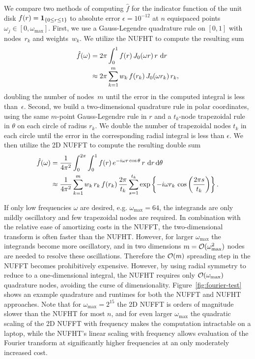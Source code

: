 We compare two methods of computing $\hat{f}$ for the indicator function of the
unit disk $f(r) = \bm{1}_{\left\{ 0 \leq r \leq 1\right\}}$ to absolute error $\epsilon = 10^{-12}$
at $n$ equispaced points $\omega_j \in [0, \omega_{\text{max}}]$. First, we use
a Gauss-Legendre quadrature rule on $[0,1]$ with nodes~$r_k$ and weights~$w_k$.
We utilize the NUFHT to compute the resulting sum
\begin{equation}
  \begin{aligned}
  \hat{f}(\omega) 
  &= 2\pi\int_0^1 f(r) \, J_0(\omega r) \, r \, \mathop{}\!\mathrm{d}{r} \\
  &\approx 2\pi \sum_{k=1}^m w_k \, f(r_k) \, J_0(\omega r_k) \, r_k,
  \end{aligned}
\end{equation}
doubling the number of nodes~$m$ until the error in the computed integral is
less than~$\epsilon$. Second, we build a two-dimensional quadrature rule in
polar coordinates, using the same $m$-point Gauss-Legendre rule in $r$ and a
$t_k$-node trapezoidal rule in $\theta$ on each circle of radius $r_k$. We
double the number of trapezoidal nodes $t_k$ in each circle until the error in
the corresponding radial integral is less than $\epsilon$. We then utilize the
2D NUFFT to compute the resulting double sum
\begin{align}
  \hat{f}(\omega) 
  &= \frac{1}{4\pi^2} \int_0^{2\pi} \int_0^1 f(r) \, e^{-i\omega r\cos\theta} \,
    r \, \mathop{}\!\mathrm{d}{r} \mathop{}\!\mathrm{d}{\theta} \\
  &\approx \frac{1}{4\pi^2} \sum_{k=1}^{m} w_k \, r_k \, f(r_k) \,
    \frac{2\pi}{t_k}
    \sum_{s=1}^{t_k} \exp\left\{-i\omega r_k \, \cos\left(\frac{2\pi s}{t_k}\right)\right\}.
\end{align}

If only low frequencies $\omega$ are desired, e.g. $\omega_{\text{max}} = 64$,
the integrands are only mildly oscillatory and few trapezoidal nodes are
required. In combination with the relative ease of amortizing costs in the
NUFFT, the two-dimensional transform is often faster than the NUFHT. However,
for larger $\omega_{\text{max}}$ the integrands become more oscillatory, and in
two dimensions $m = \mathcal{O}(\omega_{\text{max}}^2)$ nodes are needed to resolve
these oscillations. Therefore the $\mathcal{O}(m)$ spreading step in the NUFFT becomes
prohibitively expensive. However, by using radial symmetry to reduce to a
one-dimensional integral, the NUFHT requires only $\mathcal{O}(\omega_{\text{max}})$
quadrature nodes, avoiding the curse of dimensionality.
Figure~\ref{fig:fourier-test} shows an example quadrature and runtimes for both
the NUFFT and NUFHT approaches. Note that for $\omega_{\text{max}} = 2^{15}$ the
2D NUFFT is orders of magnitude slower than the NUFHT for most $n$, and for even
larger $\omega_{\text{max}}$ the quadratic scaling of the 2D NUFFT with
frequency makes the computation intractable on a laptop, while the NUFHT's
linear scaling with frequency allows evaluation of the Fourier transform at
significantly higher frequencies at an only moderately increased cost.

